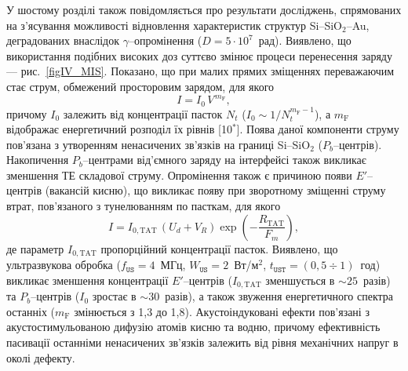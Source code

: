 У шостому розділі також повідомляється про результати досліджень, спрямованих на з'ясування можливості відновлення характеристик структур Si--SiO$_2$--Au,
деградованих внаслідок $\gamma$--опромінення ($D=5\cdot10^7$~рад).
Виявлено, що використання подібних високих доз суттєво змінює процеси перенесення заряду --- рис.~\ref{figIV_MIS}.
Показано, що при малих прямих зміщеннях переважаючим стає струм, обмежений просторовим зарядом, для якого
\begin{equation}\label{eqVIsclc}
  I=I_0\,V^{\,m_\mathrm{F}},
\end{equation}
причому $I_0$ залежить від концентрації пасток $N_t$ ($I_0\sim 1/N_t^{m_\mathrm{F}-1}$),
а $m_\mathrm{F}$ відображає енергетичний розподіл їх рівнів
[10$^*$].
Поява даної компоненти струму пов'язана з утворенням ненасичених зв'язків на границі Si--SiO$_2$ ($P_b$--центрів).
Накопичення $P_b$--центрами від'ємного заряду на інтерфейсі також викликає зменшення ТЕ складової струму.
Опромінення також є причиною появи $E'$--центрів (вакансій кисню), що
викликає появу при зворотному зміщенні струму втрат, пов'язаного з тунелюванням по пасткам, для якого
\begin{equation}\label{eqIVTAT}
  I=I_{0,\mathrm{TAT}}\,(U_d+V_R)\exp\left(-\frac{R_\mathrm{TAT}}{F_m}\right),
\end{equation}
де параметр $I_{0,\mathrm{TAT}}$ пропорційний концентрації пасток.
Виявлено, що
ультразвукова обробка
($f_\mathtt{US}=4$~МГц, $W_\mathtt{US}=2$~Вт/м$^2$, $t_\mathtt{UST}=(0,5\div1)$~год) викликає зменшення концентрації
$E'$--центрів ($I_{0,\mathrm{TAT}}$ зменшується в $\sim25$~разів) та  $P_b$--центрів ($I_0$ зростає в $\sim30$~разів),
а також звуження енергетичного спектра останніх ($m_\mathrm{F}$ змінюється з 1,3 до 1,8).
Акустоіндуковані ефекти пов'язані з акустостимульованою дифузію  атомів кисню та водню, причому ефективність пасивації останніми ненасичених зв'язків залежить
від рівня механічних напруг в околі дефекту.



